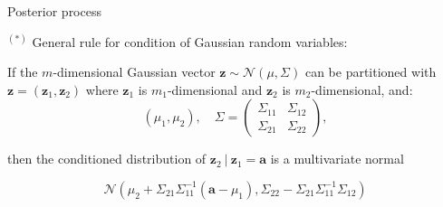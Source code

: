 \begin{vbframe}{Posterior process}
\framebreak 

$^{(*)}$ General rule for condition of Gaussian random variables: 

\lz 

  If the $m$-dimensional Gaussian vector $\bm{z} \sim \mathcal{N}(\mu, \Sigma)$ can be partitioned with $\bm{z} = \left(\bm{z}_1, \bm{z}_2\right)$ where $\bm{z}_1$ is $m_1$-dimensional and $\bm{z}_2$ is $m_2$-dimensional, and:
$$\left(\mu_1, \mu_2\right), \quad \Sigma = \begin{pmatrix} \Sigma_{11} & \Sigma_{12} \\ \Sigma_{21} & \Sigma_{22} \end{pmatrix},$$

then the conditioned distribution of $\bm{z}_2 ~|~ \bm{z}_1 = \bm{a}$ is a multivariate normal  

$$
  \mathcal{N}\left(\mu_2 + \Sigma_{21} \Sigma_{11}^{-1}\left(\bm{a} - \mu_1\right), \Sigma_{22} - \Sigma_{21}\Sigma_{11}^{-1}\Sigma_{12} \right)
$$

\end{vbframe} 

